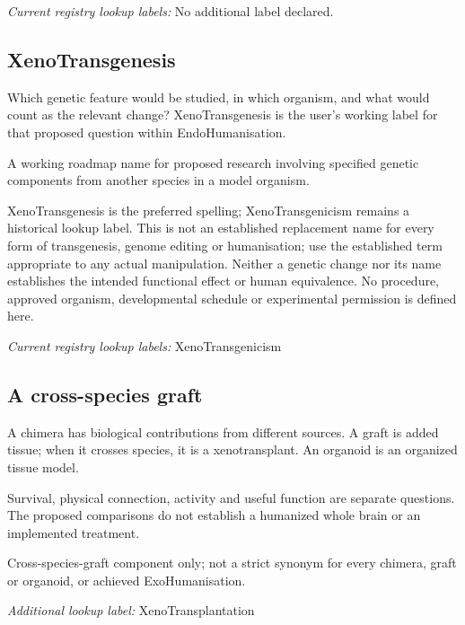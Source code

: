 \noindent\textit{Current registry lookup labels:} No additional label declared.\par

\subsection*{XenoTransgenesis}
\noindent Which genetic feature would be studied, in which organism, and what would count as the relevant change? XenoTransgenesis is the user’s working label for that proposed question within EndoHumanisation.\par
\noindent A working roadmap name for proposed research involving specified genetic components from another species in a model organism.\par
\begin{samepage}
\noindent XenoTransgenesis is the preferred spelling; XenoTransgenicism remains a historical lookup label. This is not an established replacement name for every form of transgenesis, genome editing or humanisation; use the established term appropriate to any actual manipulation. Neither a genetic change nor its name establishes the intended functional effect or human equivalence. No procedure, approved organism, developmental schedule or experimental permission is defined here.\par\nopagebreak[4]

\end{samepage}


\noindent\textit{Current registry lookup labels:} XenoTransgenicism\par

\subsection*{A cross-species graft}

\noindent A chimera has biological contributions from different sources. A graft is added tissue; when it crosses species, it is a xenotransplant. An organoid is an organized tissue model.\par

\noindent Survival, physical connection, activity and useful function are separate questions. The proposed comparisons do not establish a humanized whole brain or an implemented treatment.\par

\begin{samepage}

\noindent Cross-species-graft component only; not a strict synonym for every chimera, graft or organoid, or achieved ExoHumanisation.\par\nopagebreak[4]

\noindent\textit{Additional lookup label:} XenoTransplantation\par

\end{samepage}

